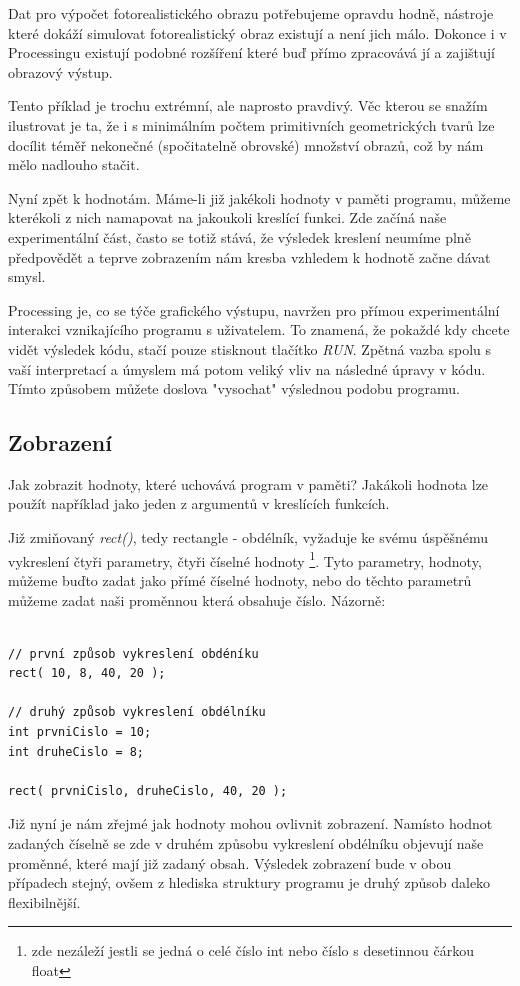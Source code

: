 \documentclass[10pt,twopage]{book}
\newcommand{\pododdil}[1]{\subsection{#1}\label{subsec:#1}}
\newcommand{\vyraz}[1]{\textit{\gls{#1}}\index{#1}}
\begin{document}
Dat pro výpočet fotorealistického obrazu potřebujeme opravdu hodně, nástroje které dokáží simulovat fotorealistický obraz existují a není jich málo. Dokonce i v Processingu existují podobné rozšíření které buď přímo zpracovává jí a zajištují obrazový výstup.

Tento příklad je trochu extrémní, ale naprosto pravdivý. Věc kterou se snažím ilustrovat je ta, že i s minimálním počtem primitivních geometrických tvarů lze docílit téměř nekonečné (spočitatelně obrovské) množství obrazů, což by nám mělo nadlouho stačit.

Nyní zpět k hodnotám. Máme-li již jakékoli hodnoty v paměti programu, můžeme kterékoli z nich namapovat na jakoukoli kreslící funkci. Zde začíná naše experimentální část, často se totiž stává, že výsledek kreslení neumíme plně předpovědět a teprve zobrazením nám kresba vzhledem k hodnotě začne dávat smysl.

Processing je, co se týče grafického výstupu, navržen pro přímou experimentální interakci vznikajícího programu s uživatelem. To znamená, že pokaždé kdy chcete vidět výsledek kódu, stačí pouze stisknout tlačítko {\em RUN}. Zpětná vazba spolu s vaší interpretací a úmyslem má potom veliký vliv na následné úpravy v kódu. Tímto způsobem můžete doslova "vysochat" výslednou podobu programu.

\pododdil{Zobrazení}

Jak zobrazit hodnoty, které uchovává program v paměti? Jakákoli hodnota lze použít například jako jeden z argumentů v kreslících funkcích.

Již zmiňovaný \vyraz{rect()}, tedy rectangle - obdélník, vyžaduje ke svému úspěšnému vykreslení čtyři parametry, čtyři číselné hodnoty \footnote{zde nezáleží jestli se jedná o celé číslo int nebo číslo s desetinnou čárkou float}. Tyto parametry, hodnoty, můžeme buďto zadat jako přímé číselné hodnoty, nebo do těchto parametrů můžeme zadat naši proměnnou která obsahuje číslo. Názorně:

\begin{lstlisting}

// první způsob vykreslení obdéníku
rect( 10, 8, 40, 20 );

// druhý způsob vykreslení obdélníku
int prvniCislo = 10;
int druheCislo = 8;

rect( prvniCislo, druheCislo, 40, 20 );

\end{lstlisting}

Již nyní je nám zřejmé jak hodnoty mohou ovlivnit zobrazení. Namísto hodnot zadaných číselně se zde v druhém způsobu vykreslení obdélníku objevují naše proměnné, které mají již zadaný obsah. Výsledek zobrazení bude v obou případech stejný, ovšem z hlediska struktury programu je druhý způsob daleko flexibilnější.
\end{document}

